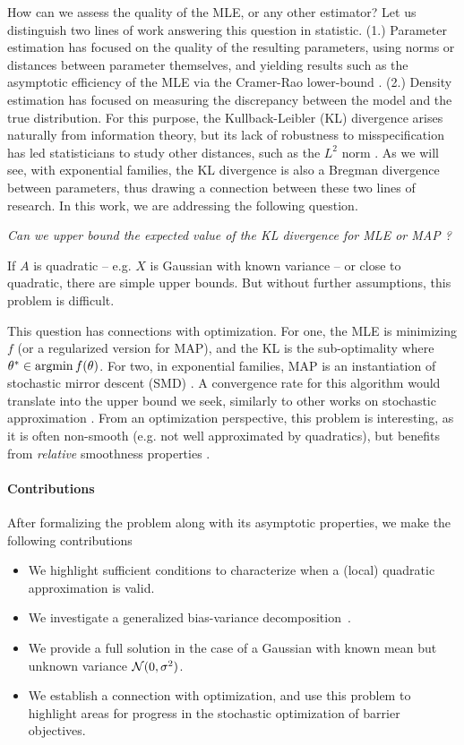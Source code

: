 \documentclass[twoside]{article}
\newcommand{\cond}{\,\vert\,}
\newcommand{\logpart}{A}
\newcommand{\nat}{\theta}
\begin{document}
How can we assess the quality of the MLE, or any other estimator?
Let us distinguish two lines of work answering this question in statistic.
(1.) Parameter estimation has focused on the quality of the resulting parameters, using norms or distances between parameter themselves, and yielding results such as the asymptotic efficiency of the MLE via the Cramer-Rao lower-bound \citep{aitken1942estimation}.
(2.) Density estimation has focused on measuring the discrepancy between the model and the true distribution.
For this purpose, the Kullback-Leibler (KL) divergence arises naturally from information theory,
but its lack of robustness to misspecification has led statisticians to study other distances, such as the $L^2$ norm \citep[\S1.2]{tsybakov2009introduction}.
As we will see, with exponential families, the KL divergence is also a Bregman divergence between parameters, thus drawing a connection between these two lines of research. 
In this work, we are addressing the following question.

\emph{Can we upper bound  the expected value of the KL divergence for MLE or MAP ?}

If $\logpart$ is quadratic -- e.g. $X$ is Gaussian with known variance --
or close to quadratic, there are simple upper bounds. 
But without further assumptions, this problem is difficult.

This question has connections with optimization.
For one, the MLE is minimizing $f$ (or a regularized version for MAP), and the KL is the sub-optimality
\alignn{
f(\nat) - f(\nat^*) = \KL\paren{p(\cdot \cond \nat^*) || p(\cdot \cond \nat) }
}
where $\nat^* \in \argmin f(\nat)$.
For two, in exponential families, MAP is an instantiation of stochastic mirror descent (SMD) \citep{nemirovski2009robust}.
A convergence rate for this algorithm would translate into the upper bound we seek, similarly to other works on stochastic approximation \citep{bach2013nonstronglyconvex}. %
From an optimization perspective, this problem is interesting, as it is often non-smooth (e.g. not well approximated by quadratics), but benefits from \emph{relative} smoothness properties \citep{birnbaum2011distributed}.

\paragraph{Contributions}
After formalizing the problem along with its asymptotic properties, we make the following contributions
\begin{itemize}
	\item We highlight sufficient conditions to characterize when a (local) quadratic approximation is valid.
	\item We investigate a generalized bias-variance decomposition~\citep{pfau2013generalized}.
	\item We provide a full solution in the case of a Gaussian with known mean but unknown variance ${\mathcal N}(0,\sigma^2)$.
	\item We establish a connection with optimization, and use this problem to highlight areas for progress in the stochastic optimization of barrier objectives.
\end{itemize}
\end{document}
